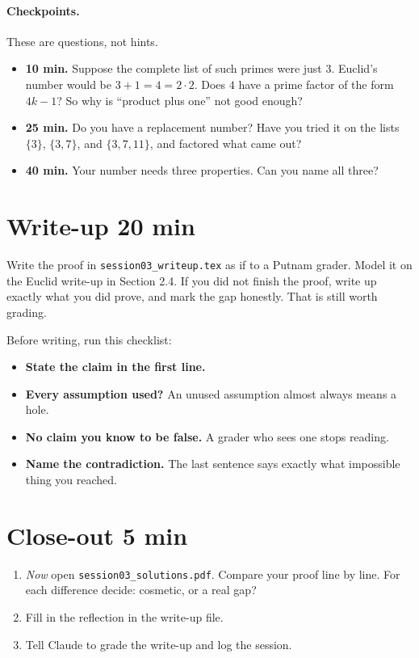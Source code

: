 \documentclass[11pt]{article}
\theoremstyle{plain}
\theoremstyle{definition}
\begin{document}
\paragraph{Checkpoints.} These are questions, not hints.
\begin{itemize}
  \item \textbf{10 min.} Suppose the complete list of such primes were just $3$. Euclid's number would be $3 + 1 = 4 = 2 \cdot 2$. Does $4$ have a prime factor of the form $4k-1$? So why is ``product plus one'' not good enough?
  \item \textbf{25 min.} Do you have a replacement number? Have you tried it on the lists $\{3\}$, $\{3, 7\}$, and $\{3, 7, 11\}$, and factored what came out?
  \item \textbf{40 min.} Your number needs three properties. Can you name all three?
\end{itemize}

\section{Write-up \hfill 20 min}

Write the proof in \texttt{session03\_writeup.tex} as if to a Putnam grader. Model it on the Euclid write-up in Section 2.4. If you did not finish the proof, write up exactly what you did prove, and mark the gap honestly. That is still worth grading.

Before writing, run this checklist:
\begin{itemize}
  \item[\checkbox] \textbf{State the claim in the first line.}
  \item[\checkbox] \textbf{Every assumption used?} An unused assumption almost always means a hole.
  \item[\checkbox] \textbf{No claim you know to be false.} A grader who sees one stops reading.
  \item[\checkbox] \textbf{Name the contradiction.} The last sentence says exactly what impossible thing you reached.
\end{itemize}

\section{Close-out \hfill 5 min}
\begin{enumerate}
  \item \emph{Now} open \texttt{session03\_solutions.pdf}. Compare your proof line by line. For each difference decide: cosmetic, or a real gap?
  \item Fill in the reflection in the write-up file.
  \item Tell Claude to grade the write-up and log the session.
\end{enumerate}
\end{document}
